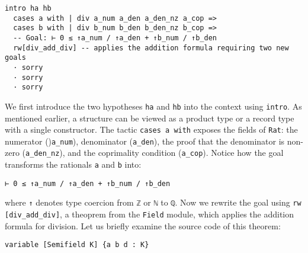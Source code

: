 \begin{example}
\begin{lstlisting}[language=lean]
  intro ha hb
  cases a with | div a_num a_den a_den_nz a_cop =>
  cases b with | div b_num b_den b_den_nz b_cop =>
  -- Goal: ⊢ 0 ≤ ↑a_num / ↑a_den + ↑b_num / ↑b_den
  rw[div_add_div] -- applies the addition formula requiring two new goals 
  · sorry 
  · sorry 
  · sorry
\end{lstlisting}
  \newpage
  We first introduce the two hypotheses \lstinline[language=lean]|ha| and
  \lstinline[language=lean]|hb| into the context using \lstinline[language=lean]|intro|.
  As mentioned earlier, a structure can be viewed as a product type or a record type with
  a single constructor. The tactic \lstinline[language=lean]|cases a with|
  exposes the fields of \lstinline[language=lean]|Rat|: the
  numerator ()\lstinline[language=lean]|a_num|), denominator
  (\lstinline[language=lean]|a_den|), the proof that the denominator is non-zero
  (\lstinline[language=lean]|a_den_nz|), and the coprimality condition
  (\lstinline[language=lean]|a_cop|). Notice how the goal transforms
  the rationals \lstinline[language=lean]|a| and \lstinline[language=lean]|b| into:
  \begin{lstlisting}[language=lean]
⊢ 0 ≤ ↑a_num / ↑a_den + ↑b_num / ↑b_den
\end{lstlisting}
  where \lstinline[language=lean]|↑| denotes type coercion from
  \lstinline[language=lean]|ℤ| or \lstinline[language=lean]|ℕ| to
  \lstinline[language=lean]|ℚ|.
  Now we rewrite the goal using \lstinline[language=lean]|rw [div_add_div]|,
  a theoprem from the \lstinline[language=lean]|Field| module,
  which applies the addition formula for division.
  Let us briefly examine the source code of this theorem:
  \begin{lstlisting}[language=lean]
variable [Semifield K] {a b d : K}


\end{lstlisting}
\end{example}
